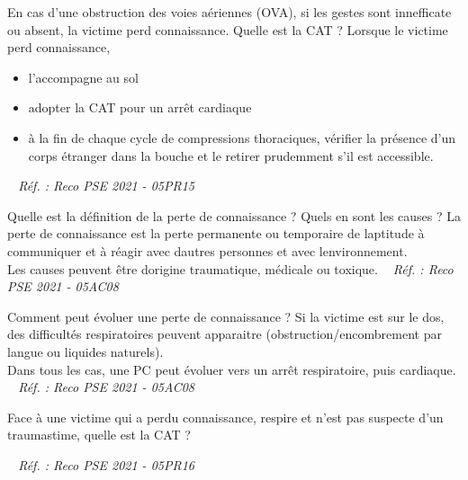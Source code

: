 \documentclass[grid,avery5371,landscape]{flashcards}
\makeatletter
\newcounter{nocarte}
\newcommand{\categ}[1]{%
  \def\@categ{#1}%
  \setcounter{nocarte}{0}%
}
\newcommand{\source}[1]{%
  \medskip
  \itshape%
   ~ \hfill Réf. : #1}
\makeatother
\begin{document}
\color[HTML]{003273}
\categ{PSE}
\begin{flashcard}[CAT]{
 En cas d'une obstruction des voies aériennes (OVA), si les gestes sont innefficate ou absent, la victime perd connaissance. Quelle est la CAT ?   }
  Lorsque le victime perd connaissance, \begin{itemize} \item l'accompagne au sol \item adopter la CAT pour un arrêt cardiaque \item à la fin de chaque cycle de compressions thoraciques, vérifier la présence d'un corps étranger dans la bouche et le retirer prudemment s'il est accessible. \end{itemize}
  \source{Reco PSE 2021 - 05PR15}
\end{flashcard}


\color[HTML]{003273}
\categ{PSE}
\begin{flashcard}[bilan]{
 Quelle est la définition de la perte de connaissance ? Quels en sont les causes ?   }
  La perte de connaissance est la perte permanente ou temporaire de laptitude à communiquer et à réagir avec dautres personnes et avec lenvironnement. \\ Les causes peuvent être dorigine traumatique, médicale ou toxique.
  \source{Reco PSE 2021 - 05AC08}
\end{flashcard}


\color[HTML]{003273}
\categ{PSE}
\begin{flashcard}[bilan]{
 Comment peut évoluer une perte de connaissance ?   }
  Si la victime est sur le dos, des difficultés respiratoires peuvent apparaitre (obstruction/encombrement par langue ou liquides naturels). \\ Dans tous les cas, une PC peut évoluer vers un arrêt respiratoire, puis cardiaque.
  \source{Reco PSE 2021 - 05AC08}
\end{flashcard}


\color[HTML]{003273}
\categ{PSE}
\begin{flashcard}[CAT]{
 Face à une victime qui a perdu connaissance, respire et n'est pas suspecte d'un traumastime, quelle est la CAT ?   }
  
  \source{Reco PSE 2021 - 05PR16}
\end{flashcard}
\end{document}
